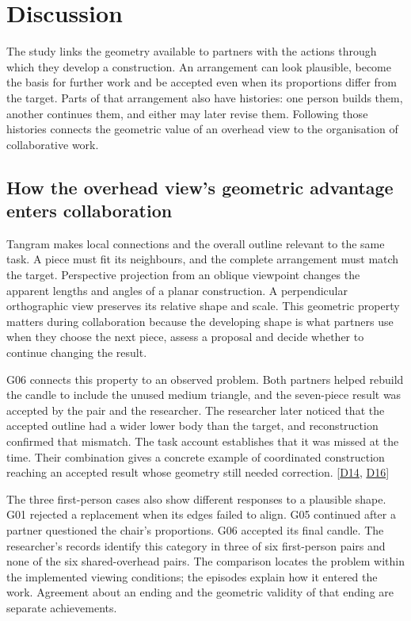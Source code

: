 \chapter{Discussion}\label{chap:6}

The study links the geometry available to partners with the actions through which they develop a construction. An arrangement can look plausible, become the basis for further work and be accepted even when its proportions differ from the target. Parts of that arrangement also have histories: one person builds them, another continues them, and either may later revise them. Following those histories connects the geometric value of an overhead view to the organisation of collaborative work.

\section{How the overhead view's geometric advantage enters collaboration}\label{sec:6-1}

Tangram makes local connections and the overall outline relevant to the same task. A piece must fit its neighbours, and the complete arrangement must match the target. Perspective projection from an oblique viewpoint changes the apparent lengths and angles of a planar construction. A perpendicular orthographic view preserves its relative shape and scale. This geometric property matters during collaboration because the developing shape is what partners use when they choose the next piece, assess a proposal and decide whether to continue changing the result.

G06 connects this property to an observed problem. Both partners helped rebuild the candle to include the unused medium triangle, and the seven-piece result was accepted by the pair and the researcher. The researcher later noticed that the accepted outline had a wider lower body than the target, and reconstruction confirmed that mismatch. The task account establishes that it was missed at the time. Their combination gives a concrete example of coordinated construction reaching an accepted result whose geometry still needed correction. [\hyperlink{src:D14}{D14}, \hyperlink{src:D16}{D16}]

The three first-person cases also show different responses to a plausible shape. G01 rejected a replacement when its edges failed to align. G05 continued after a partner questioned the chair's proportions. G06 accepted its final candle. The researcher's records identify this category in three of six first-person pairs and none of the six shared-overhead pairs. The comparison locates the problem within the implemented viewing conditions; the episodes explain how it entered the work. Agreement about an ending and the geometric validity of that ending are separate achievements.

